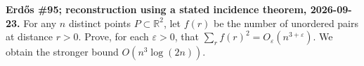 \textbf{Erd\H{o}s \#95; reconstruction using a stated incidence theorem, 2026-09-23.}
For any $n$ distinct points $P\subset\mathbb R^2$, let $f(r)$ be the number of unordered pairs at distance $r>0$. Prove, for each $\varepsilon>0$, that $\sum_r f(r)^2=O_\varepsilon(n^{3+\varepsilon})$. We obtain the stronger bound $O(n^3\log(2n))$.
